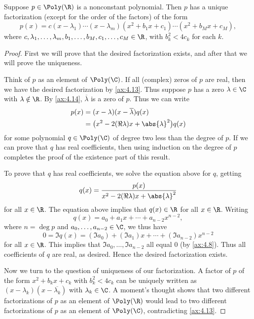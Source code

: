 \begin{result}\label{ax:4.16}
Suppose $p\in\Poly(\R)$ is a nonconstant polynomial. Then $p$ has a unique
factorization (except for the order of the factors) of the form
\[ p(x) = c(x-\lambda_1)\cdots(x-\lambda_m)(x^2+b_1x+c_1)\cdots(x^2+b_Mx+c_M), \]
where $c,\lambda_1,\dots,\lambda_m,b_1,\dots,b_M,c_1,\dots,c_M\in\R$, with
$b_k^2<4c_k$ for each $k$.
\end{result}

\begin{proof}
First we will prove that the desired factorization exists, and after that we
will prove the uniqueness.

Think of $p$ as an element of $\Poly(\C)$. If all (complex) zeros of $p$ are
real, then we have the desired factorization by \ref{ax:4.13}. Thus suppose
$p$ has a zero $\lambda\in\C$ with $\lambda\notin\R$. By \ref{ax:4.14},
$\overline{\lambda}$ is a zero of $p$. Thus we can write
\begin{align*}
p(x) &= (x-\lambda)(x-\overline{\lambda})q(x)\\
     &= \bigl(x^2-2(\Re\lambda)x+\abs{\lambda}^2\bigr)q(x)
\end{align*}
for some polynomial $q\in\Poly(\C)$ of degree two less than the degree of $p$.
If we can prove that $q$ has real coefficients, then using induction on the
degree of $p$ completes the proof of the existence part of this result.

To prove that $q$ has real coefficients, we solve the equation above for $q$,
getting
\[ q(x) = \frac{p(x)}{x^2-2(\Re\lambda)x+\abs{\lambda}^2} \]
for all $x\in\R$. The equation above implies that $q(x)\in\R$ for all
$x\in\R$. Writing
\[ q(x) = a_0+a_1x+\cdots+a_{n-2}x^{n-2}, \]
where $n=\deg p$ and $a_0,\dots,a_{n-2}\in\C$, we thus have
\[ 0 = \Im q(x) = (\Im a_0)+(\Im a_1)x+\cdots+(\Im a_{n-2})x^{n-2} \]
for all $x\in\R$. This implies that $\Im a_0,\dots,\Im a_{n-2}$ all equal $0$
(by \ref{ax:4.8}). Thus all coefficients of $q$ are real, as desired. Hence the
desired factorization exists.

Now we turn to the question of uniqueness of our factorization. A factor of $p$
of the form $x^2+b_kx+c_k$ with $b_k^2<4c_k$ can be uniquely written as
$(x-\lambda_k)(x-\overline{\lambda_k})$ with $\lambda_k\in\C$. A moment's
thought shows that two different factorizations of $p$ as an element of
$\Poly(\R)$ would lead to two different factorizations of $p$ as an element of
$\Poly(\C)$, contradicting \ref{ax:4.13}.
\end{proof}

